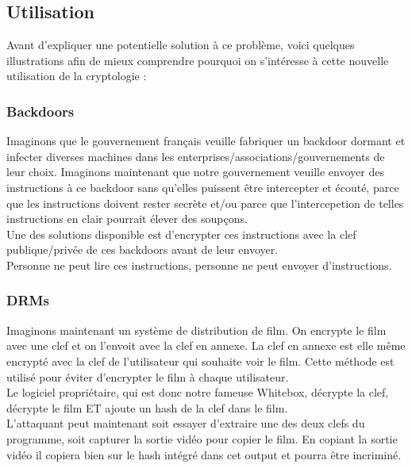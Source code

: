 \documentclass[a4paper,12pt]{article}
\begin{document}
\subsection{Utilisation}

Avant d'expliquer une potentielle solution à ce problème, voici quelques illustrations afin de mieux comprendre pourquoi on s'intéresse à cette nouvelle utilisation de la cryptologie :\\


\subsubsection{Backdoors}

Imaginons que le gouvernement français veuille fabriquer un backdoor dormant et infecter diverses machines dans les enterprises/associations/gouvernements de leur choix. Imaginons maintenant que notre gouvernement veuille envoyer des instructions à ce backdoor sans qu'elles puissent être intercepter et écouté, parce que les instructions doivent rester secrète et/ou parce que l'intercepetion de telles instructions en clair pourrait élever des soupçons.\\

Une des solutions disponible est d'encrypter ces instructions avec la clef publique/privée de ces backdoors avant de leur envoyer.\\

Personne ne peut lire ces instructions, personne ne peut envoyer d'instructions.

\subsubsection{DRMs}

Imaginons maintenant un système de distribution de film. On encrypte le film avec une clef et on l'envoit avec la clef en annexe. La clef en annexe est elle même encrypté avec la clef de l'utilisateur qui souhaite voir le film. Cette méthode est utilisé pour éviter d'encrypter le film à chaque utilisateur.\\
Le logiciel propriétaire, qui est donc notre fameuse Whitebox, décrypte la clef, décrypte le film ET ajoute un hash de la clef dans le film.\\
L'attaquant peut maintenant soit essayer d'extraire une des deux clefs du programme, soit capturer la sortie vidéo pour copier le film. En copiant la sortie vidéo il copiera bien sur le hash intégré dans cet output et pourra être incriminé.
\end{document}
